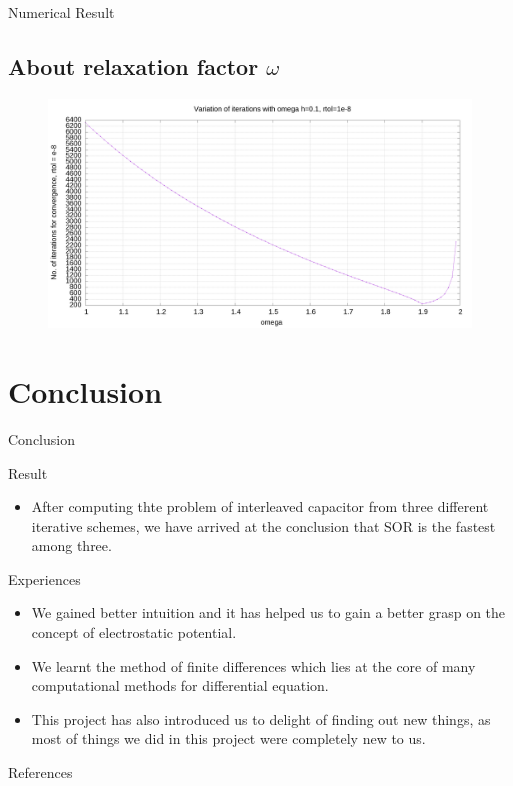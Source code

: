 \documentclass{beamer}
\begin{document}
\begin{frame}[allowframebreaks]{Numerical Result}
					\subsection{About relaxation factor $\omega$}
					\begin{figure}
						\centering
						\includegraphics[width=\textwidth]{../report/content/graphs/omega.png}
					\end{figure}
					
				\end{frame}
				\section{Conclusion}
					\begin{frame}{Conclusion}
						\begin{block}{Result}
							\begin{itemize}
								\item After computing thte problem of interleaved capacitor from three different iterative schemes, we have arrived at the conclusion that SOR is the fastest among three.
							\end{itemize}
							\end{block}
						\begin{block}{Experiences}
							\begin{itemize}
								\item We gained better intuition and it has helped us to gain a better grasp on the concept of electrostatic potential.
								\item We learnt the method of finite differences which lies at the core of many computational methods for differential equation.
								\item This project has also introduced us to delight of finding out new things, as most of things we did in this project were completely new to us.
							\end{itemize}
						\end{block}

					\end{frame}
				\begin{frame}[allowframebreaks]{References}
					\nocite{*}
					\printbibliography[heading=none]
				\end{frame}
\end{document}
